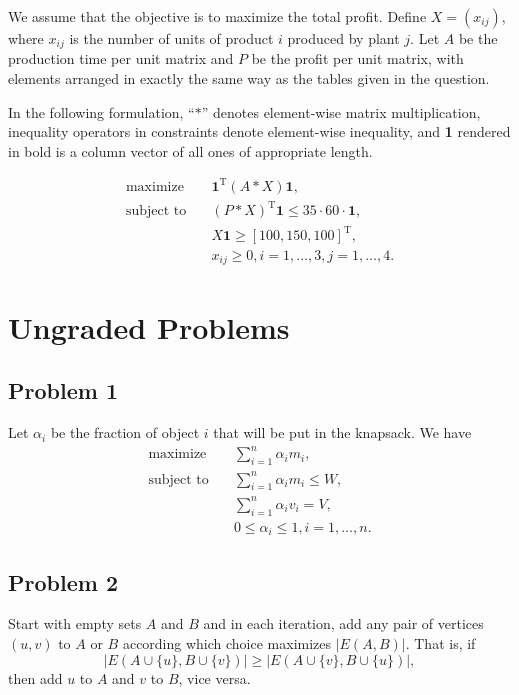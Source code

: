 \documentclass{article}
\begin{document}
We assume that the objective is to maximize the total profit. Define $X = (x_{ij})$, where $x_{ij}$ is the number of units of product $i$ produced by plant $j$. Let $A$ be the production time per unit matrix and $P$ be the profit per unit matrix, with elements arranged in exactly the same way as the tables given in the question.

In the following formulation, ``$*$'' denotes element-wise matrix multiplication, inequality operators in constraints denote element-wise inequality, and \textbf{1} rendered in bold is a column vector of all ones of appropriate length.

\begin{align*}
    \textrm{maximize}\quad &\mathbf{1}^\textrm{T}(A * X)\mathbf{1},\\
    \textrm{subject to}\quad &(P * X)^\textrm{T} \mathbf{1} \le 35 \cdot 60 \cdot \mathbf{1},\\
    & X\mathbf{1} \ge [100, 150, 100]^\textrm{T},\\
    & x_{ij} \ge 0, i = 1, \dots, 3, j = 1, \dots, 4.
\end{align*}

\section*{Ungraded Problems}

\subsection*{Problem 1}

Let $\alpha_i$ be the fraction of object $i$ that will be put in the knapsack. We have
\begin{align*}
    \textrm{maximize}\quad &\sum_{i = 1}^n \alpha_im_i,\\
    \textrm{subject to}\quad &\sum_{i = 1}^n \alpha_im_i \le W,\\
    &\sum_{i = 1}^n \alpha_iv_i = V,\\
    &0 \le \alpha_i \le 1, i = 1, \dots, n.
\end{align*}

\subsection*{Problem 2}

Start with empty sets $A$ and $B$ and in each iteration, add any pair of vertices $(u, v)$ to $A$ or $B$ according which choice maximizes $|E(A, B)|$. That is, if
\[
    |E(A \cup \{u\},B \cup \{v\})| \ge |E(A \cup \{v\},B \cup \{u\})|,
\]
then add $u$ to $A$ and $v$ to $B$, vice versa.
\end{document}

